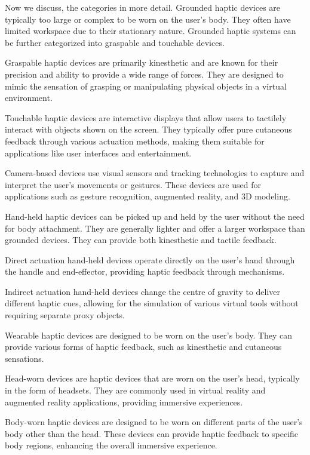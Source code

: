 Now we discuss, the categories in more detail. Grounded haptic devices are typically too large or complex to be worn on the user's body. They often have limited workspace due to their stationary nature. Grounded haptic systems can be further categorized into graspable and touchable devices. 

Graspable haptic devices are primarily kinesthetic and are known for their precision and ability to provide a wide range of forces. They are designed to mimic the sensation of grasping or manipulating physical objects in a virtual environment. 

Touchable haptic devices are interactive displays that allow users to tactilely interact with objects shown on the screen. They typically offer pure cutaneous feedback through various actuation methods, making them suitable for applications like user interfaces and entertainment.

Camera-based devices use visual sensors and tracking technologies to capture and interpret the user's movements or gestures. These devices are used for applications such as gesture recognition, augmented reality, and 3D modeling. 


Hand-held haptic devices can be picked up and held by the user without the need for body attachment. They are generally lighter and offer a larger workspace than grounded devices. They can provide both kinesthetic and tactile feedback. 


Direct actuation hand-held devices operate directly on the user's hand through the handle and end-effector, providing haptic feedback through mechanisms. 

Indirect actuation hand-held devices change the centre of gravity to deliver different haptic cues, allowing for the simulation of various virtual tools without requiring separate proxy objects. 

Wearable haptic devices are designed to be worn on the user's body. They can provide various forms of haptic feedback, such as kinesthetic and cutaneous sensations. 

Head-worn devices are haptic devices that are worn on the user's head, typically in the form of headsets. They are commonly used in virtual reality and augmented reality applications, providing immersive experiences.
 
Body-worn haptic devices are designed to be worn on different parts of the user's body other than the head. These devices can provide haptic feedback to specific body regions, enhancing the overall immersive experience.

